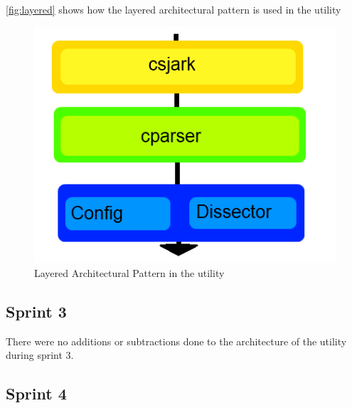 \autoref{fig:layered} shows how the layered architectural pattern is used in the \gls{utility}

\begin{figure}[htb]
	\includegraphics[width = \textwidth]{./planning/img/layered}
	\caption{Layered Architectural Pattern in the \gls{utility}\label{fig:layered}}
\end{figure}



\subsection{Sprint 3}
There were no additions or subtractions done to the architecture of the utility during sprint 3.

\subsection{Sprint 4}


